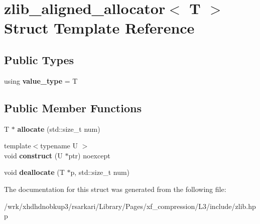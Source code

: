\hypertarget{structzlib__aligned__allocator}{\section{zlib\-\_\-aligned\-\_\-allocator$<$ T $>$ Struct Template Reference}
\label{structzlib__aligned__allocator}
}
\subsection*{Public Types}
\begin{DoxyCompactItemize}
\item 
\hypertarget{structzlib__aligned__allocator_adfcc99fcd81e0b0c4dbd26ea51cb9986}{using {\bfseries value\-\_\-type} = T}\label{structzlib__aligned__allocator_adfcc99fcd81e0b0c4dbd26ea51cb9986}

\end{DoxyCompactItemize}
\subsection*{Public Member Functions}
\begin{DoxyCompactItemize}
\item 
\hypertarget{structzlib__aligned__allocator_a7bb6564c8ff34ec174e22a82e3259318}{T $\ast$ {\bfseries allocate} (std\-::size\-\_\-t num)}\label{structzlib__aligned__allocator_a7bb6564c8ff34ec174e22a82e3259318}

\item 
\hypertarget{structzlib__aligned__allocator_a536bca0042d96f416eec564fedc24dcd}{{\footnotesize template$<$typename U $>$ }\\void {\bfseries construct} (U $\ast$ptr) noexcept}\label{structzlib__aligned__allocator_a536bca0042d96f416eec564fedc24dcd}

\item 
\hypertarget{structzlib__aligned__allocator_a2cc7874853131a3de9a8947075f6237b}{void {\bfseries deallocate} (T $\ast$p, std\-::size\-\_\-t num)}\label{structzlib__aligned__allocator_a2cc7874853131a3de9a8947075f6237b}

\end{DoxyCompactItemize}


The documentation for this struct was generated from the following file\-:\begin{DoxyCompactItemize}
\item 
/wrk/xhdhdnobkup3/rsarkari/\-Library/\-Pages/xf\-\_\-compression/\-L3/include/zlib.\-hpp\end{DoxyCompactItemize}
